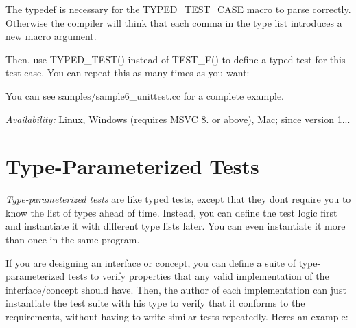 The {\ttfamily typedef} is necessary for the {\ttfamily T\+Y\+P\+E\+D\+\_\+\+T\+E\+S\+T\+\_\+\+C\+A\+SE} macro to parse correctly. Otherwise the compiler will think that each comma in the type list introduces a new macro argument.

Then, use {\ttfamily T\+Y\+P\+E\+D\+\_\+\+T\+E\+S\+T()} instead of {\ttfamily T\+E\+S\+T\+\_\+\+F()} to define a typed test for this test case. You can repeat this as many times as you want\+:


\begin{DoxyCode}{0}
\DoxyCodeLine{}
\DoxyCodeLine{}
\DoxyCodeLine{\}}
\DoxyCodeLine{}
\end{DoxyCode}


You can see {\ttfamily samples/sample6\+\_\+unittest.\+cc} for a complete example.

{\itshape Availability\+:} Linux, Windows (requires M\+S\+VC 8. or above), Mac; since version 1...

\section*{Type-\/\+Parameterized Tests}

{\itshape Type-\/parameterized tests} are like typed tests, except that they don\textquotesingle{}t require you to know the list of types ahead of time. Instead, you can define the test logic first and instantiate it with different type lists later. You can even instantiate it more than once in the same program.

If you are designing an interface or concept, you can define a suite of type-\/parameterized tests to verify properties that any valid implementation of the interface/concept should have. Then, the author of each implementation can just instantiate the test suite with his type to verify that it conforms to the requirements, without having to write similar tests repeatedly. Here\textquotesingle{}s an example\+:

